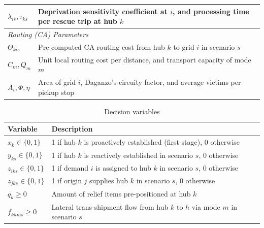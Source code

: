 \begin{table}[htbp]
\begin{tabularx}{\textwidth}{p{2cm} X}
$\lambda_{is}, \tau_{ks}$ & Deprivation sensitivity coefficient at $i$, and processing time per rescue trip at hub $k$ \\ \midrule
\multicolumn{2}{l}{\textit{Routing (CA) Parameters}} \\
$\Theta_{kis}$ & Pre-computed CA routing cost from hub $k$ to grid $i$ in scenario $s$ \\
$C_m, Q_m$ & Unit local routing cost per distance, and transport capacity of mode $m$ \\
$A_i, \Phi, \eta$ & Area of grid $i$, Daganzo's circuity factor, and average victims per pickup stop \\ \bottomrule
\end{tabularx}
\end{table}

\begin{table}[htbp]
\centering
\caption{Decision variables}
\label{tab:variables}
\begin{tabularx}{\textwidth}{p{2cm} X} %
\toprule
\textbf{Variable} & \textbf{Description} \\ \midrule
$x_k \in \{0,1\}$ & 1 if hub $k$ is proactively established (first-stage), 0 otherwise \\
$y_{ks} \in \{0,1\}$ & 1 if hub $k$ is reactively established in scenario $s$, 0 otherwise \\
$z_{iks} \in \{0,1\}$ & 1 if demand $i$ is assigned to hub $k$ in scenario $s$, 0 otherwise \\
$z_{jks} \in \{0,1\}$ & 1 if origin $j$ supplies hub $k$ in scenario $s$, 0 otherwise \\
$q_k \ge 0$ & Amount of relief items pre-positioned at hub $k$ \\
$f_{khms} \ge 0$ & Lateral trans-shipment flow from hub $k$ to $h$ via mode $m$ in scenario $s$ \\ \bottomrule
\end{tabularx}
\end{table}

